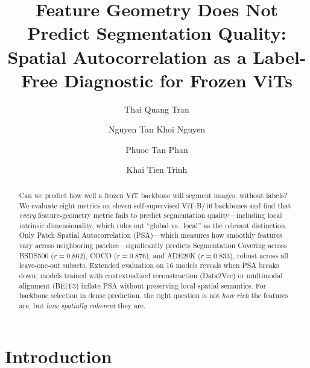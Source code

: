 \documentclass[runningheads]{llncs}
\begin{document}
\title{Feature Geometry Does Not Predict Segmentation Quality:\texorpdfstring{\\}{ }Spatial Autocorrelation as a Label-Free Diagnostic for Frozen ViTs}
\author{Thai Quang Tran \and
Nguyen Tan Khoi Nguyen \and
Phuoc Tan Phan \and
Khai Tien Trinh}
\maketitle

\begin{abstract}
Can we predict how well a frozen ViT backbone will segment images, without labels? We evaluate eight metrics on eleven self-supervised ViT-B/16 backbones and find that \emph{every} feature-geometry metric fails to predict segmentation quality---including local intrinsic dimensionality, which rules out ``global vs.\ local'' as the relevant distinction. Only Patch Spatial Autocorrelation (PSA)---which measures how smoothly features vary across neighboring patches---significantly predicts Segmentation Covering across BSDS500 ($r=0.862$), COCO ($r=0.876$), and ADE20K ($r=0.833$), robust across all leave-one-out subsets. Extended evaluation on 16 models reveals when PSA breaks down: models trained with contextualized reconstruction (Data2Vec) or multimodal alignment (BEiT3) inflate PSA without preserving local spatial semantics. For backbone selection in dense prediction, the right question is not \emph{how rich} the features are, but \emph{how spatially coherent} they are.
\end{abstract}

\section{Introduction}
\end{document}
